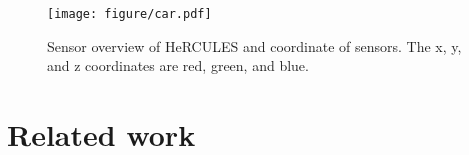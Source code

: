 

\begin{figure}[t]
    \centering
    \texttt{[image: figure/car.pdf]}
    \caption{Sensor overview of HeRCULES and coordinate of sensors. The x, y, and z coordinates are red, green, and blue.}
    \label{fig:car}
    \vspace{-5mm}
\end{figure}

\section{Related work}
\label{sec:relatedwork}
